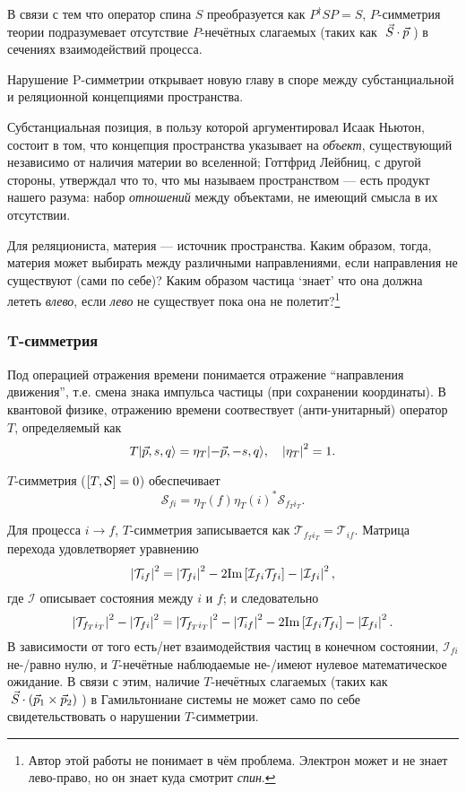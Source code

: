 \documentclass[14pt]{extarticle}
\newcommand{\SMatrix}{\mathcal{S}}
\newcommand{\TMatrix}{\mathcal{T}}
\newcommand{\IMatrix}{\mathcal{I}}
\begin{document}
В связи с тем что оператор спина $S$ преобразуется как $P^\dagger S P = S$, $P$-симметрия теории подразумевает отсутствие $P$-нечётных слагаемых (таких как $\; {\vec{S}} \cdot {\vec{p}}\;$) в сечениях взаимодействий процесса.~\cite[стр. 30]{Symmetries}\\

\begin{Remark}
Нарушение P-симметрии открывает новую главу в споре между субстанциальной и реляционной концепциями пространства. 

Субстанциальная позиция, в пользу которой аргументировал Исаак Ньютон, состоит в том, что концепция пространства указывает на \emph{объект}, существующий независимо от наличия материи во вселенной; Готтфрид Лейбниц, с другой стороны, утверждал что то, что мы называем пространством --- есть продукт нашего разума: набор \emph{отношений} между объектами, не имеющий смысла в их отсутствии.~\cite[разд. 6.1]{ConceptOfSpace} 

Для реляциониста, материя --- источник пространства. Каким образом, тогда, материя может выбирать между различными направлениями, если направления не существуют (сами по себе)? Каким образом частица `знает' что она должна лететь \emph{влево}, если \emph{лево} не существует пока она не полетит?\footnote{Автор этой работы не понимает в чём проблема. Электрон может и не знает лево-право, но он знает куда смотрит \emph{спин}.}
\end{Remark}

\subsubsection{T-симметрия}

Под операцией отражения времени понимается отражение \enquote{направления движения}, т.е. смена знака импульса частицы (при сохранении координаты). В квантовой физике, отражению времени соотвествует (анти-унитарный) оператор $T$, определяемый как
\[
T\vert{\vec{p}, s, q}\rangle = \eta_T\vert{-\vec{p}, -s, q}\rangle,\quad \left\vert{\eta_T}\right\vert^2 = 1.
\] 

$T$-симметрия ($\sqB{T, \SMatrix} = 0$) обеспечивает 
\[
\SMatrix_{fi} = \eta_T(f)\eta_T(i)^*\SMatrix_{f_T i_T}.
\]

Для процесса $i\to f$, $T$-симметрия записывается как $\TMatrix_{f_T i_T} = \TMatrix_{if}$. Матрица перехода удовлетворяет уравнению 
\[
\Mod{\TMatrix_{if}}^2 = \Mod{\TMatrix_{fi}}^2 - 2\Im{\IMatrix_{fi}\TMatrix_{fi}} - \Mod{\IMatrix_{fi}}^2,
\]
где $\IMatrix$ описывает состояния между $i$ и $f$; и следовательно
\[
\Mod{\TMatrix_{f_T i_T}}^2 - \Mod{\TMatrix_{fi}}^2 = \Mod{\TMatrix_{f_T i_T}}^2 - \Mod{\TMatrix_{if}}^2 - 2\Im{\IMatrix_{fi}\TMatrix_{fi}} - \Mod{\IMatrix_{fi}}^2.
\]
В зависимости от того есть/нет взаимодействия частиц в конечном состоянии, $\IMatrix_{fi}$ не-/равно нулю, и $T$-нечётные наблюдаемые не-/имеют нулевое математическое ожидание. В связи с этим, наличие $T$-нечётных слагаемых (таких как $\dotprod{\vec S}{\rndB{\xprod{\vec p_1}{\vec p_2}}}$) в Гамильтониане системы не может само по себе свидетельствовать о нарушении $T$-симметрии.~\cite[стр. 146]{Symmetries}
\end{document}
